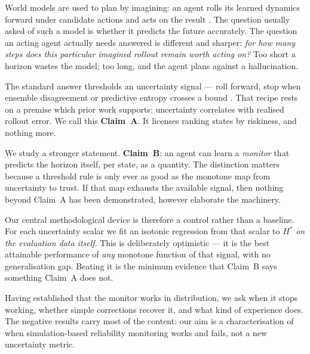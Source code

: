 \documentclass[twocolumn,10pt]{article}
\newcommand{\Hstar}{H^{*}}
\begin{document}
World models are used to plan by imagining: an agent rolls its learned dynamics forward under
candidate actions and acts on the result \citep{ha2018world,hafner2019planet,hafner2020dream}.
The question usually asked of such a model is whether it predicts the future accurately. The
question an acting agent actually needs answered is different and sharper: \emph{for how many
steps does this particular imagined rollout remain worth acting on?} Too short a horizon wastes
the model; too long, and the agent plans against a hallucination.

The standard answer thresholds an uncertainty signal --- roll forward, stop when ensemble
disagreement or predictive entropy crosses a bound \citep{janner2019mbpo,chua2018pets}. That
recipe rests on a premise which prior work supports: uncertainty correlates with realised
rollout error. We call this \textbf{Claim~A}. It licenses ranking states by riskiness, and
nothing more.

We study a stronger statement. \textbf{Claim~B}: an agent can learn a \emph{monitor} that
predicts the horizon itself, per state, as a quantity. The distinction matters because a
threshold rule is only ever as good as the monotone map from uncertainty to trust. If that map
exhausts the available signal, then nothing beyond Claim~A has been demonstrated, however
elaborate the machinery.

Our central methodological device is therefore a control rather than a baseline. For each
uncertainty scalar we fit an isotonic regression from that scalar to $\Hstar$ \emph{on the
evaluation data itself}. This is deliberately optimistic --- it is the best attainable
performance of \emph{any} monotone function of that signal, with no generalisation gap.
Beating it is the minimum evidence that Claim~B says something Claim~A does not.

Having established that the monitor works in distribution, we ask when it stops working,
whether simple corrections recover it, and what kind of experience does. The negative results
carry most of the content: our aim is a characterisation of when simulation-based reliability
monitoring works and fails, not a new uncertainty metric.
\end{document}
